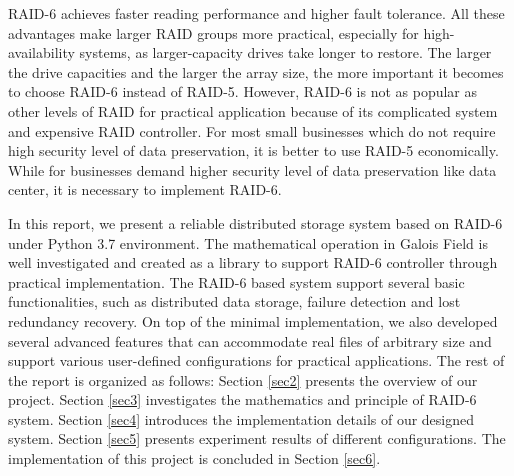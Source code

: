 \documentclass[journal]{IEEEtran}
\begin{document}
RAID-6 achieves faster reading performance and higher fault tolerance. All these advantages make larger RAID groups more practical, especially for high-availability systems, as larger-capacity drives take longer to restore. The larger the drive capacities and the larger the array size, the more important it becomes to choose RAID-6 instead of RAID-5. However, RAID-6 is not as popular as other levels of RAID for practical application because of its complicated system and expensive RAID controller. For most small businesses which do not require high security level of data preservation, it is better to use RAID-5 economically. While for businesses demand higher security level of data preservation like data center, it is necessary to implement RAID-6.

In this report, we present a reliable distributed storage system based on RAID-6 under Python 3.7 environment. The mathematical operation in Galois Field is well investigated and created as a library to support RAID-6 controller through practical implementation. The RAID-6 based system support several basic functionalities, such as distributed data storage, failure detection and lost redundancy recovery. On top of the minimal implementation, we also developed several advanced features that can accommodate real files of arbitrary size and support various user-defined configurations for practical applications. The rest of the report is organized as follows: Section \ref{sec2} presents the overview of our project. Section \ref{sec3} investigates the mathematics and principle of RAID-6 system. Section \ref{sec4} introduces the implementation details of our designed system. Section \ref{sec5} presents experiment results of different configurations. The implementation of this project is concluded in Section \ref{sec6}.
\end{document}
